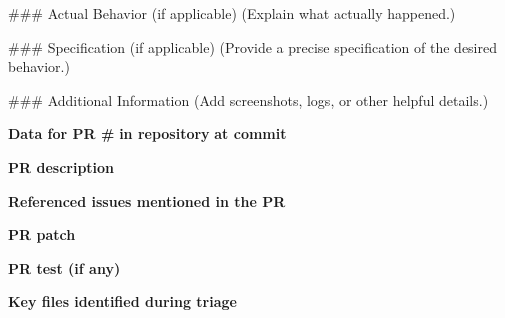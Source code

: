 \begin{promptbox}
\begin{schemabox}
### Actual Behavior (if applicable)
(Explain what actually happened.)

### Specification (if applicable)
(Provide a precise specification of the desired behavior.)

### Additional Information
(Add screenshots, logs, or other helpful details.)
\end{schemabox}

\medskip
\textbf{Data for PR \#}\textbf{ in repository }\textbf{ at commit }

\medskip
\textbf{PR description}\\

\medskip
\textbf{Referenced issues mentioned in the PR}\\

\medskip
\textbf{PR patch}\\

\medskip
\textbf{PR test (if any)}\\

\medskip
\textbf{Key files identified during triage}\\
\end{promptbox}



